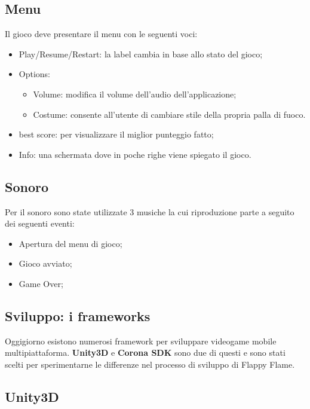 		\subsection{Menu}
			Il gioco deve presentare il menu con le seguenti voci:
			\begin{itemize}
				\item Play/Resume/Restart: la label cambia in base allo stato del gioco;
				\item Options:
				\begin{itemize}
					\item Volume: modifica il volume dell'audio dell'applicazione;
					\item Costume: consente all'utente di cambiare stile della propria palla di fuoco.
				\end{itemize}
				\item best score: per visualizzare il miglior punteggio fatto;
				\item Info: una schermata dove in poche righe viene spiegato il gioco.
			\end{itemize}
		
		\subsection{Sonoro}
			Per il sonoro sono state utilizzate 3 musiche la cui riproduzione parte a seguito dei seguenti eventi:
			\begin{itemize}
				\item Apertura del menu di gioco;
				\item Gioco avviato;
				\item Game Over;
			\end{itemize}
	

	
	\subsection{Sviluppo: i frameworks}
		Oggigiorno esistono numerosi framework per sviluppare videogame mobile multipiattaforma. \textbf{Unity3D} e \textbf{Corona SDK} sono due di questi e sono stati scelti per sperimentarne le differenze nel processo di sviluppo di Flappy Flame.
		
		\subsection{Unity3D}
		
